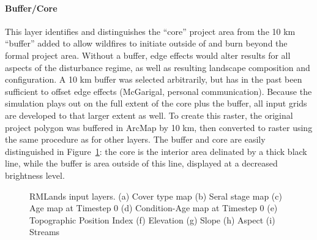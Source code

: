 \paragraph{Buffer/Core} 
This layer identifies and distinguishes the ``core'' project area from the 10 km ``buffer'' added to allow wildfires to initiate outside of and burn beyond the formal project area. Without a buffer, edge effects would alter results for all aspects of the disturbance regime, as well as resulting landscape composition and configuration. A 10 km buffer was selected arbitrarily, but has in the past been sufficient to offset edge effects (McGarigal, personal communication). Because the simulation plays out on the full extent of the core plus the buffer, all input grids are developed to that larger extent as well. To create this raster, the original project polygon was buffered in ArcMap by 10 km, then converted to raster using the same procedure as for other layers. The buffer and core are easily distinguished in Figure~\ref{fig:inputlayermaps}: the core is the interior area delinated by a thick black line, while the buffer is area outside of this line, displayed at a decreased brightness level.


\begin{figure}[!htbp]
  \centering
   \qquad
	 \qquad
   \qquad
	 \qquad

  \caption{RMLands input layers. (a) Cover type map (b) Seral stage map (c) Age map at Timestep 0 (d) Condition-Age map at Timestep 0 (e) Topographic Position Index (f) Elevation (g) Slope (h) Aspect (i) Streams}
  \label{fig:inputlayermaps}
\end{figure}


